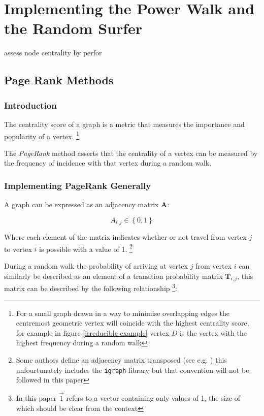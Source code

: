 \documentclass[11pt]{article}
\author{Ryan Greenup}
\date{\today}
\title{}
\begin{document}
\tableofcontents

\section{Implementing the Power Walk and the Random Surfer}
\label{sec:orge0335d9}
assess node centrality by perfor \cite{teamSparseMatrixOperations}

\subsection{Page Rank Methods}
\label{sec:org8d574a0}
\subsubsection{Introduction}
\label{sec:org8cb19db}

The centrality score of a graph is a metric that measures the importance and
popularity of a vertex. \footnote{For a small graph drawn in a way to minimise
overlapping edges the centremost geometric vertex will coincide with the highest
centrality score, for example in figure \ref{irreducible-example} vertex \(D\) is the
vertex with the highest frequency during a random walk}


The \emph{PageRank} method asserts that the centrality of a vertex can be measured by the frequency of incidence with that vertex during a random walk.

\subsubsection{Implementing PageRank Generally}
\label{PageRank-Generally}
A graph can be expressed as an adjacency matrix \(\mathbf{A}\):

\[
A_{i,j} \in \left\{ 0,1 \right\}
\]

Where each element of the matrix indicates whether or not travel from vertex \(j\) to vertex \(i\) is possible with a value of 1. \footnote{Some authors define an adjacency matrix transposed (see e.g. \cite{rosenDiscreteMathematicsIts2007,AdjacencyMatrix2020a,meghabghabSearchEnginesLink2008}) this unfourtunately includes the \texttt{igraph} library \cite{gaborcsardiIgraphManualPages2019} but that convention will not be followed in this paper}

During a random walk the probability of arriving at vertex \(j\) from vertex
\(i\) can similarly be described as an element of a transition probability
matrix \(\mathbf{T}_{i,j}\), this matrix can be described by the following
relationship \footnote{In this paper \(\vec{1}\) refers to a vector containing only
values of 1, the size of which should be clear from the context}:
\end{document}
